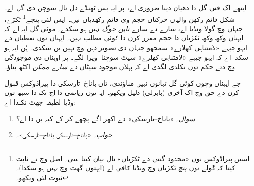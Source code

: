 \documentclass[../../../include/open-logic-section]{subfiles}
\begin{document}
ایتھے اک فنی گل دا دھیان دینا ضروری اے، پر ایہ بس ٹھنڈے دل نال سوچن دی گل اے۔ شکل قائم رکھن والیاں حرکتاں حجم وی قائم رکھدیاں نیں۔ ایس لئی پنجے\footnote{اسیں پیراڈوکس نوں «محدود گنتی دے ٹکڑیاں» نال بیان کیتا سی۔ اصل وچ \citet{Robinson1947} نے ثابت کیتا کہ گولے نوں \emph{پنج} ٹکڑیاں وچ ونڈنا کافی اے (ایہتوں گھٹ وچ نہیں ہو سکدا)۔ ثبوت لئی \citet[pp.~66--7]{Wagon2016} ویکھو۔} ٹکڑے، جنہاں وچ گولا ونڈیا اے، سارے دے سارے \emph{ناپن جوگ} نہیں ہو سکدے۔ موٹی گل ایہ اے کہ ایہناں وکھ وکھ ٹکڑیاں دا حجم مقرر کرن دا کوئی مطلب نہیں۔ ایہناں نوں نقطیاں دے ایہو جیہے «لامتناہی کھلارے» سمجھو جنہاں دی تصویر ذہن وچ نہیں بن سکدی۔ ہُن ایہ ہو سکدا اے کہ ایہو جیہے «لامتناہی کھلرے» سیٹ سوچنا اوپرا لگے۔ پر اوہناں دی موجودگی \stagesacc{} وچ دتے حکم توں نکلدی لگدی اے کہ پہلاں موجود سیٹاں دے \emph{سارے ممکن} اکٹھ بناؤ۔

جے ایہناں وچوں کوئی گل تہانوں نہیں مناؤندی، تاں باناخ–تارسکی دا پیراڈوکس قبول کرن دے حق وچ اک آخری (باہرلی) دلیل ویکھو۔ ایہ توں ریاضی دا اج تک دا سبھ توں وڈیا لطیفہ جھٹ نکلدا اے:
\begin{enumerate}
	\item[] \emph{سوال}۔ «باناخ–تارسکی» دے اکھر اگے پچھے کر کے کیہ بن دا اے؟
	\item[] \emph{جواب}۔ «باناخ–تارسکی باناخ–تارسکی»۔
\end{enumerate}
\end{document}
